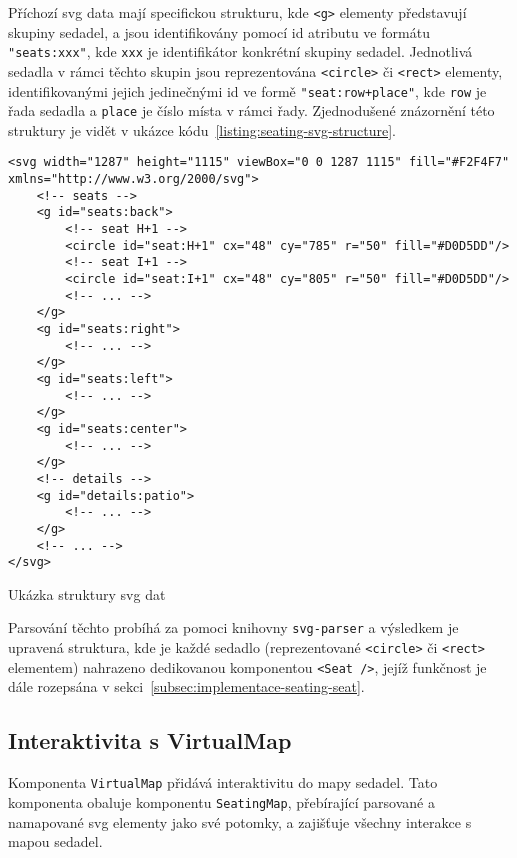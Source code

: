 Příchozí \ac{svg} data mají specifickou strukturu, kde \texttt{<g>} elementy představují skupiny sedadel, a jsou identifikovány pomocí id atributu ve formátu \texttt{"seats:xxx"}, kde \texttt{xxx} je identifikátor konkrétní skupiny sedadel.
Jednotlivá sedadla v rámci těchto skupin jsou reprezentována \texttt{<circle>} či \texttt{<rect>} elementy, identifikovanými jejich jedinečnými id ve formě \texttt{"seat:row+place"}, kde \texttt{row} je řada sedadla a \texttt{place} je číslo místa v rámci řady.
Zjednodušené znázornění této struktury je vidět v ukázce kódu~\ref{listing:seating-svg-structure}.

\begin{listing}[!h]
\begin{verbatim}
<svg width="1287" height="1115" viewBox="0 0 1287 1115" fill="#F2F4F7" xmlns="http://www.w3.org/2000/svg">
    <!-- seats -->
    <g id="seats:back">
        <!-- seat H+1 -->
        <circle id="seat:H+1" cx="48" cy="785" r="50" fill="#D0D5DD"/>
        <!-- seat I+1 -->
        <circle id="seat:I+1" cx="48" cy="805" r="50" fill="#D0D5DD"/>
        <!-- ... -->
    </g>
    <g id="seats:right">
        <!-- ... -->
    </g>
    <g id="seats:left">
        <!-- ... -->
    </g>
    <g id="seats:center">
        <!-- ... -->
    </g>
    <!-- details -->
    <g id="details:patio">
        <!-- ... -->
    </g>
    <!-- ... -->
</svg>
\end{verbatim}
\caption{Ukázka struktury \ac{svg} dat}
\label{listing:seating-svg-structure}
\end{listing}

Parsování těchto probíhá za pomoci knihovny \texttt{svg-parser} a výsledkem je upravená struktura, kde je každé sedadlo (reprezentované \texttt{<circle>} či \texttt{<rect>} elementem) nahrazeno dedikovanou komponentou \texttt{<Seat />}, jejíž funkčnost je dále rozepsána v sekci~\ref{subsec:implementace-seating-seat}.

\subsection{Interaktivita s VirtualMap}
\label{subsec:implementace-seating-virtualmap}
Komponenta \texttt{VirtualMap} přidává interaktivitu do mapy sedadel.
Tato komponenta obaluje komponentu \texttt{SeatingMap}, přebírající parsované a namapované \ac{svg} elementy jako své potomky, a zajišťuje všechny interakce s mapou sedadel.

